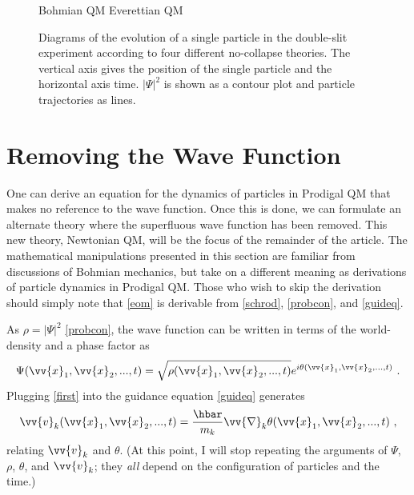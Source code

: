 \documentclass[12pt,secnumarabic,balancelastpage,amsmath,amssymb,nofootinbib]{article}
\begin{document}
\begin{figure}[h!]
\large{\hspace*{3 cm} Bohmian QM \hspace{3.9 cm} Everettian QM}
\caption{Diagrams of the evolution of a single particle in the double-slit experiment according to four different no-collapse theories.  The vertical axis gives the position of the single particle and the horizontal axis time.  $|\Psi|^2$ is shown as a contour plot and particle trajectories as lines.}
\label{NoCollapseQMs}
\end{figure}

\section{Removing the Wave Function}\label{removing}

One can derive an equation for the dynamics of particles in Prodigal QM that makes no reference to the wave function.  Once this is done, we can formulate an alternate theory where the superfluous wave function has been removed.  This new theory, Newtonian QM, will be the focus of the remainder of the article.  The mathematical manipulations presented in this section are familiar from discussions of Bohmian mechanics, but take on a different meaning as derivations of particle dynamics in Prodigal QM.  Those who wish to skip the derivation should simply note that \eqref{eom} is derivable from \eqref{schrod}, \eqref{probcon}, and \eqref{guideq}.

As $\rho=|\Psi|^2$ \eqref{probcon}, the wave function can be written in terms of the world-density and a phase factor as
\begin{equation}
\Psi(\vv{x}_1,\vv{x}_2,...,t)=\sqrt{\rho(\vv{x}_1,\vv{x}_2,...,t)}e^{i\theta(\vv{x}_1,\vv{x}_2,...,t)}\ .
\label{first}
\end{equation}
Plugging \eqref{first} into the guidance equation \eqref{guideq} generates
\begin{equation}
\vv{v}_k(\vv{x}_1,\vv{x}_2,...,t)=\frac{\hbar}{m_k}\vv{\nabla}_k\theta(\vv{x}_1,\vv{x}_2,...,t)\ ,
\label{guideq2}
\end{equation}
relating $\vv{v}_k$ and $\theta$.  (At this point, I will stop repeating the arguments of $\Psi$, $\rho$, $\theta$, and $\vv{v}_k$; they \emph{all} depend on the configuration of particles and the time.)
\end{document}
